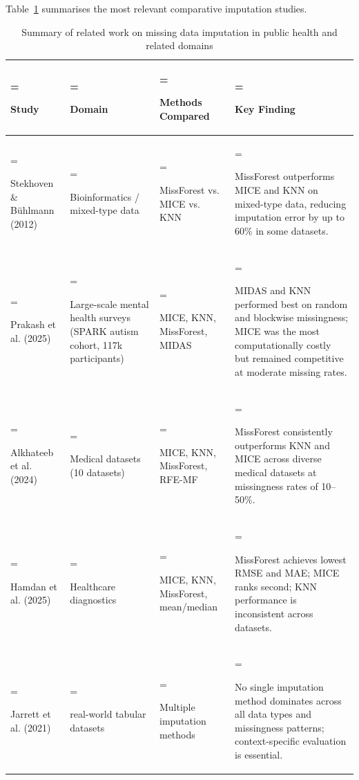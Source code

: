 Table~\ref{tbl:summary_of_related_work_on_mis} summarises the most relevant comparative imputation studies.

\begin{table}[H]
\centering
\caption[Related work on missing data imputation in public health]{Summary of related work on missing data imputation in public health and related domains}
\label{tbl:summary_of_related_work_on_mis}
\renewcommand{\arraystretch}{1.0}
\small
\begin{tabularx}{\textwidth}{|>{\hsize=0.790\hsize\linewidth=\hsize\raggedright\arraybackslash}X|>{\hsize=0.795\hsize\linewidth=\hsize\raggedright\arraybackslash}X|>{\hsize=0.824\hsize\linewidth=\hsize\raggedright\arraybackslash}X|>{\hsize=1.592\hsize\linewidth=\hsize\raggedright\arraybackslash}X|}
\hline
\textbf{Study} & \textbf{Domain} & \textbf{Methods Compared} & \textbf{Key Finding} \\ \hline
Stekhoven \& Bühlmann (2012) \cite{ref12} & Bioinformatics / mixed-type data & MissForest vs. MICE vs. KNN & MissForest outperforms MICE and KNN on mixed-type data, reducing imputation error by up to 60\% in some datasets. \\ \hline
Prakash et al. (2025) \cite{ref55} & Large-scale mental health surveys ({SPARK} autism cohort, 117k participants) & MICE, KNN, MissForest, MIDAS & MIDAS and KNN performed best on random and blockwise missingness; MICE was the most computationally costly but remained competitive at moderate missing rates. \\ \hline
Alkhateeb et al. (2024) \cite{ref32} & Medical datasets (10 datasets) & MICE, KNN, MissForest, RFE-MF & MissForest consistently outperforms KNN and MICE across diverse medical datasets at missingness rates of 10--50\%. \\ \hline
Hamdan et al. (2025) \cite{ref33} & Healthcare diagnostics & MICE, KNN, MissForest, mean/median & MissForest achieves lowest RMSE and MAE; MICE ranks second; KNN performance is inconsistent across datasets. \\ \hline
Jarrett et al. (2021) \cite{ref8} & 69 real-world tabular datasets & Multiple imputation methods & No single imputation method dominates across all data types and missingness patterns; context-specific evaluation is essential. \\ \hline
\end{tabularx}
\end{table}

